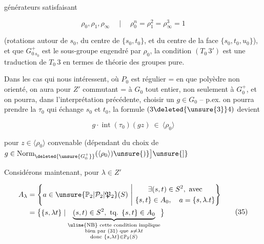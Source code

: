 
générateurs satisfaisant

\[
\rho_0,\rho_1,\rho_\infty\quad\mid\quad \rho_0^n=\rho_1^2=\rho_\infty^3=1
\]


(rotations autour de $s_0$, du centre de $\{s_0,t_0\}$, et du centre de la face $\{s_0,t_0,u_0\}$), et que $G_{0\,s_0}^+$ est le sous-groupe engendré par $\rho_0$, la condition $(T_0\,3')$ est  une traduction de $T_0\,3$ en termes de théorie des groupes pure. 

Dans les cas qui nous intéressent, où $P_0$ est régulier = en  que polyèdre non orienté, on aura pour  $Z'$ commutant = à $G_0$ tout entier, non seulement à $G_0^+$, et on pourra, dans l'interprétation précédente, choisir un $g\in G_0$ -- p.ex. on pourra prendre la  $\tau_0$  qui échange $s_0$ et $t_0$, la formule $(3\deleted{\unsure{3}}4)$ devient

\[
g\cdot\operatorname{int}(\tau_0)(gz)\ \in\ \langle\rho_0\rangle \tag*{$(34')$}
\]


pour $z\in\langle\rho_0\rangle$ convenable (dépendant du choix de $g\in\operatorname{Norm}_{\deleted{\unsure{G_0^+}}}(\langle\rho_0\rangle)\unsure{)}\bigr]\unsure{]}$

Considérons maintenant, pour $\lambda\in Z'$

\[
\begin{aligned}
 A_\lambda&=\left\{a\in\unsure{\mathbb P_2|\mathcal P_2|\mathfrak P_2}(S)\ \middle|\ 
 \begin{gathered}\exists(s,t)\in S^2,\ \text{avec}\\
 \{s,t\}\in A_0,\quad a=\{s,\lambda.t\}\end{gathered}\right\}\\
 &=\bigl\{\{s,\lambda t\}\mid
 \underbrace{(s,t)\in S^2,\ \text{tq. }\{s,t\}\in A_0}_{\substack{\text{\uline{NB} cette condition implique}\\
 \text{bien par (31) que }s\ne\lambda t\\
 \text{donc }\{s,\lambda t\}\in\mathbb P_2(S)}}\bigr\}
\end{aligned}\tag*{$(35)$}
\]

